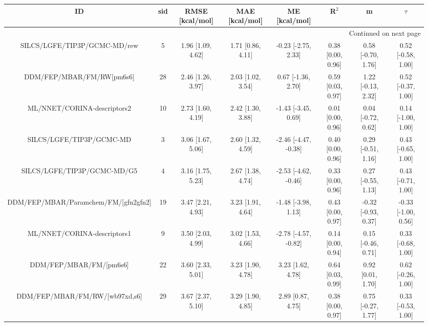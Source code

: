 \documentclass[8pt]{article}
\begin{document}
\begin{center}
\begin{footnotesize}
\begin{longtable}{|cccccccc|}
\toprule
                                       ID & sid &     RMSE [kcal/mol] &      MAE [kcal/mol] &         ME [kcal/mol] &              R$^2$ &                    m &               $\tau$ \\
\midrule
\endhead
\midrule
\multicolumn{8}{r}{{Continued on next page}} \\
\midrule
\endfoot

\bottomrule
\endlastfoot
             SILCS/LGFE/TIP3P/GCMC-MD/rew &   5 &   1.96 [1.09, 4.62] &   1.71 [0.86, 4.11] &   -0.23 [-2.75, 2.33] &  0.38 [0.00, 0.96] &   0.58 [-0.70, 1.76] &   0.52 [-0.58, 1.00] \\
                DDM/FEP/MBAR/FM/RW[pm6s6] &  28 &   2.46 [1.26, 3.97] &   2.03 [1.02, 3.54] &    0.67 [-1.36, 2.70] &  0.59 [0.03, 0.97] &   1.22 [-0.13, 2.32] &   0.52 [-0.37, 1.00] \\
              ML/NNET/CORINA-descriptors2 &  10 &   2.73 [1.60, 4.19] &   2.42 [1.30, 3.88] &   -1.43 [-3.45, 0.69] &  0.01 [0.00, 0.96] &   0.04 [-0.72, 0.62] &   0.14 [-1.00, 1.00] \\
                 SILCS/LGFE/TIP3P/GCMC-MD &   3 &   3.06 [1.67, 5.06] &   2.60 [1.32, 4.59] &  -2.46 [-4.47, -0.38] &  0.40 [0.00, 0.96] &   0.29 [-0.51, 1.16] &   0.43 [-0.65, 1.00] \\
              SILCS/LGFE/TIP3P/GCMC-MD/G5 &   4 &   3.16 [1.75, 5.23] &   2.67 [1.38, 4.74] &  -2.53 [-4.62, -0.46] &  0.33 [0.00, 0.96] &   0.27 [-0.55, 1.13] &   0.43 [-0.71, 1.00] \\
     DDM/FEP/MBAR/Paramchem/FM/[gfn2gfn2] &  19 &   3.47 [2.21, 4.93] &   3.23 [1.91, 4.64] &   -1.48 [-3.98, 1.13] &  0.43 [0.00, 0.97] &  -0.32 [-0.93, 0.37] &  -0.33 [-1.00, 0.56] \\
              ML/NNET/CORINA-descriptors1 &   9 &   3.50 [2.03, 4.99] &   3.02 [1.53, 4.66] &  -2.78 [-4.57, -0.82] &  0.14 [0.00, 0.94] &   0.15 [-0.46, 0.71] &   0.33 [-0.68, 1.00] \\
                  DDM/FEP/MBAR/FM/[pm6s6] &  22 &   3.60 [2.33, 5.01] &   3.23 [1.90, 4.78] &     3.23 [1.62, 4.78] &  0.64 [0.03, 0.99] &    0.92 [0.01, 1.70] &   0.62 [-0.26, 1.00] \\
           DDM/FEP/MBAR/FM/RW/[wb97xd,s6] &  29 &   3.67 [2.37, 5.10] &   3.29 [1.90, 4.85] &     2.89 [0.87, 4.75] &  0.38 [0.00, 0.97] &   0.75 [-0.27, 1.77] &   0.33 [-0.53, 1.00] \\

\end{longtable}
\end{footnotesize}
\end{center}
\end{document}
